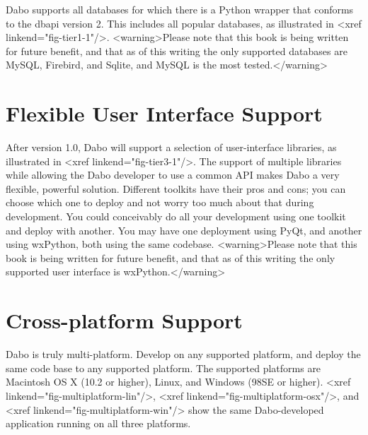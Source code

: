 Dabo supports all databases for which there is a Python wrapper that conforms to the dbapi version 2. This includes all popular databases, as illustrated in <xref linkend="fig-tier1-1"/>. <warning>Please note that this book is being written for future benefit, and that as of this writing the only supported databases are MySQL, Firebird, and Sqlite, and MySQL is the most tested.</warning>

\section{Flexible User Interface Support}

After version 1.0, Dabo will support a selection of user-interface libraries, as illustrated in <xref linkend="fig-tier3-1"/>. The support of multiple libraries while allowing the Dabo developer to use a common API makes Dabo a very flexible, powerful solution. Different toolkits have their pros and cons; you can choose which one to deploy and not worry too much about that during development. You could conceivably do all your development using one toolkit and deploy with another. You may have one deployment using PyQt, and another using wxPython, both using the same codebase. <warning>Please note that this book is being written for future benefit, and that as of this writing the only supported user interface is wxPython.</warning>

\section{Cross-platform Support}

Dabo is truly multi-platform. Develop on any supported platform, and deploy the same code base to any supported platform. The supported platforms are Macintosh OS X (10.2 or higher), Linux, and Windows (98SE or higher). <xref linkend="fig-multiplatform-lin"/>, <xref linkend="fig-multiplatform-osx"/>, and <xref linkend="fig-multiplatform-win"/> show the same Dabo-developed application running on all three platforms.
